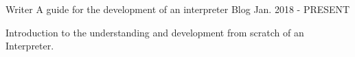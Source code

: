 

\begin{cventries}

  \cventry
    {Writer} %
    {A guide for the development of an interpreter} %
    {Blog} %
    {Jan. 2018 - PRESENT} %
    {
      \begin{cvitems} %
        \item {Introduction to the understanding and development from scratch of an Interpreter.}
      \end{cvitems}
    }
\end{cventries}
